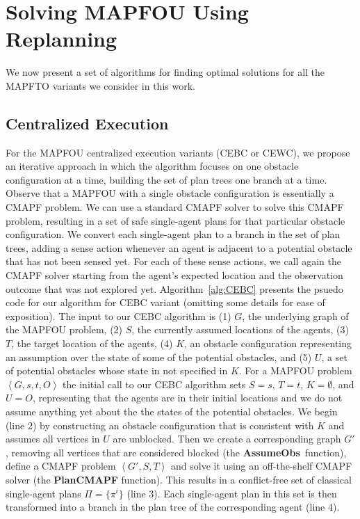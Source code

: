 \documentclass[letterpaper]{article} %
\newcommand{\assumeObs}{\textbf{AssumeObs}}
\newcommand{\tuple}[1]{\ensuremath{\left \langle #1 \right \rangle }}
\begin{document}
\section{Solving MAPFOU Using Replanning}
We now present a set of algorithms for finding optimal solutions for all the MAPFTO variants we consider in this work.
\subsection{Centralized Execution}
For the MAPFOU centralized execution variants (CEBC or CEWC), we propose an iterative approach in which the algorithm focuses on one obstacle configuration at a time, building the set of plan trees one branch at a time.
Observe that a MAPFOU with a single obstacle configuration is essentially a CMAPF problem.
We can use a standard CMAPF solver to solve this CMAPF problem, resulting in a set of safe single-agent plans for that particular obstacle configuration.
We convert each single-agent plan to a branch in the set of plan trees,
adding a sense action whenever an agent is adjacent to a potential obstacle that has not been sensed yet.
For each of these sense actions, we call again the CMAPF solver starting from the agent's expected location and the observation outcome that was not explored yet.
Algorithm~\ref{alg:CEBC} presents the psuedo code for our algorithm for CEBC variant (omitting some details for ease of exposition).
The input to our CEBC algorithm is
(1) $G$, the underlying graph of the MAPFOU problem,
(2) $S$, the currently assumed locations of the agents,
(3) $T$, the target location of the agents,
(4) $K$, an obstacle configuration representing an assumption over the state of some of the potential obstacles,
and (5) $U$, a set of potential obstacles whose state in not specified in $K$.
For a MAPFOU problem $\tuple{G,s,t,O}$ the initial call to our CEBC algorithm sets
$S=s$, $T=t$, $K=\emptyset$, and $U=O$, representing that the agents are in their initial locations and we do not assume anything yet about the the states of the potential obstacles.
We begin (line 2) by constructing an obstacle configuration that is consistent with $K$ and assumes all vertices in $U$ are unblocked.
Then we create a corresponding graph $G'$, removing all vertices that are considered blocked (the \assumeObs\ function), define a CMAPF problem $\tuple{G',S,T}$ and solve it using an off-the-shelf CMAPF solver  (the \textbf{PlanCMAPF} function).
This results in a conflict-free set of classical single-agent plans $\Pi=\{\pi^i\}$  (line 3). Each single-agent plan in this set is then transformed into a branch in the plan tree of the corresponding agent (line 4).
\end{document}
